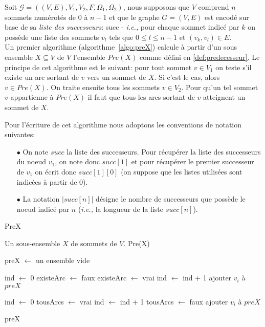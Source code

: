 Soit $\mathcal{G} = ((V,E),V_{1},V_{2}, F, \Omega _{1}, \Omega _{2})$, nous supposons que $V$ comprend $n$ sommets numérotés de $0$ à $n-1$ et que le graphe $G = (V,E)$ est encodé sur base de sa \textit{liste des successeurs}: succ - \emph{i.e.,} pour chaque sommet indicé par $k$ on possède une liste des sommets $v_l$ tels que $0 \leq l \leq n-1$ et $(v_k, v_l) \in E$.\\

Un premier algorithme (algorithme~\ref{algo:preX}) calcule à partir d'un sous ensemble $X \subseteq V$ de $V$ l'ensemble $Pre(X)$ comme défini en \ref{def:predecesseur}. Le principe de cet algorithme est le suivant: pour tout sommet $v\in V_{1}$ on teste s'il existe un arc sortant de $v$ vers un sommet de $X$. Si c'est le cas, alors $v\in Pre(X)$. On traite ensuite tous les sommets $v \in V_{2}$. Pour qu'un tel sommet $v$ appartienne à $Pre(X)$ il faut que tous les arcs sortant de $v$ atteignent un sommet de $X$.

\begin{notations}
	Pour l'écriture de cet algorithme nous adoptons les conventions de notation suivantes:
	\begin{itemize}
		\item[$\bullet$] On note $succ$ la liste des successeurs. Pour récupérer la liste des successeurs du noeud $v_1$, on note donc $succ[1]$ et pour récupérer le premier successeur de $v_1$ on écrit donc $succ[1][0]$ (on suppose que les listes utilisées sont indicées à partir de 0).
		\item[$\bullet$] La notation $|succ[n]|$ désigne le nombre de successeurs que possède le noeud indicé par $n$ (\emph{i.e.,} la longueur de la liste $succ[n]$).
	\end{itemize}
\end{notations}

\begin{algorithm}
	\caption{PreX}
	\label{algo:preX}
	\begin{algorithmic}[1]
		\REQUIRE Un sous-ensemble $X$ de sommets de $V$.
		\ENSURE Pre(X)
		
		\STATE preX $\leftarrow$ un ensemble vide
		
			\STATE ind $\leftarrow$ 0
			\STATE existeArc $\leftarrow$ faux
					\STATE existeArc $\leftarrow$ vrai
				\ELSE
					\STATE ind $\leftarrow$ ind + 1
				\ENDIF
			\ENDWHILE
				\STATE ajouter $v_{i}$ à $preX$
			\ENDIF
		\ENDFOR
		
			\STATE ind $\leftarrow$ 0
			\STATE tousArcs $\leftarrow$ vrai
					\STATE ind $\leftarrow$ ind + 1
				\ELSE
					\STATE  tousArcs $\leftarrow$ faux
				\ENDIF
			\ENDWHILE
				\STATE ajouter $v_{i}$ à $preX$
			\ENDIF
		\ENDFOR
		
		\RETURN preX
			
\end{algorithmic}
		
\end{algorithm}


